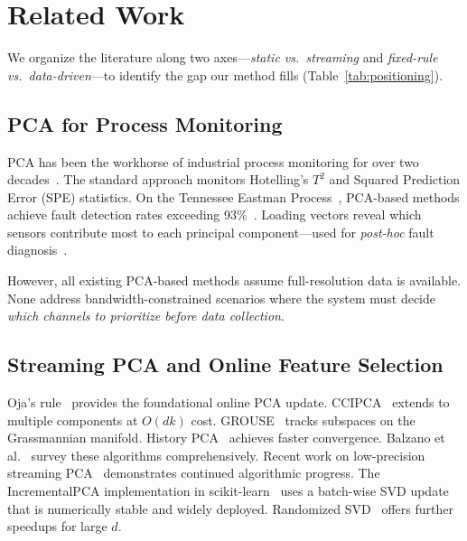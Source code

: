 \documentclass[journal]{IEEEtran}
\begin{document}
\section{Related Work}
\label{sec:related}

We organize the literature along two axes---\textit{static vs.\ streaming} and \textit{fixed-rule vs.\ data-driven}---to identify the gap our method fills (Table~\ref{tab:positioning}).

\subsection{PCA for Process Monitoring}

PCA has been the workhorse of industrial process monitoring for over two decades~\cite{chen2013pca, processmonitoring2024survey}. The standard approach monitors Hotelling's $T^2$ and Squared Prediction Error (SPE) statistics. On the Tennessee Eastman Process~\cite{downs1993tep, rieth2017tep}, PCA-based methods achieve fault detection rates exceeding 93\%~\cite{chen2013pca}. Loading vectors reveal which sensors contribute most to each principal component---used for \textit{post-hoc} fault diagnosis~\cite{mnassri2015feature}.

However, all existing PCA-based methods assume full-resolution data is available. None address bandwidth-constrained scenarios where the system must decide \textit{which channels to prioritize before data collection}.

\subsection{Streaming PCA and Online Feature Selection}

Oja's rule~\cite{oja1982simplified} provides the foundational online PCA update. CCIPCA~\cite{weng2003ccipca} extends to multiple components at $O(dk)$ cost. GROUSE~\cite{balzano2010grouse} tracks subspaces on the Grassmannian manifold. History PCA~\cite{yang2018historypca} achieves faster convergence. Balzano et al.~\cite{balzano2018streaming} survey these algorithms comprehensively. Recent work on low-precision streaming PCA~\cite{lowprecision2025streaming} demonstrates continued algorithmic progress. The IncrementalPCA implementation in scikit-learn~\cite{ross2008incremental, levy2000sequential} uses a batch-wise SVD update that is numerically stable and widely deployed. Randomized SVD~\cite{halko2011finding} offers further speedups for large $d$.
\end{document}
